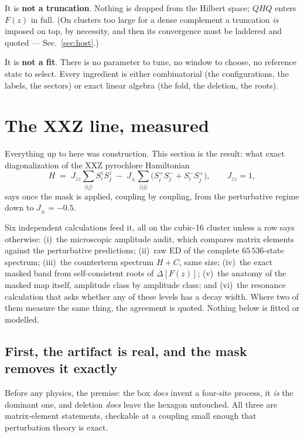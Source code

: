 \documentclass[11pt,a4paper]{article}
\newcommand{\Jpm}{J_{\pm}}
\newcommand{\Jzz}{J_{zz}}
\begin{document}
It is \textbf{not a truncation}.  Nothing is dropped from the Hilbert space;
$QHQ$ enters $F(z)$ in full.  (On clusters too large for a dense complement
a truncation \emph{is} imposed on top, by necessity, and then its
convergence must be laddered and quoted --- Sec.~\ref{sec:host}.)

It is \textbf{not a fit}.  There is no parameter to tune, no window to
choose, no reference state to select.  Every ingredient is either
combinatorial (the configurations, the labels, the sectors) or exact linear
algebra (the fold, the deletion, the roots).

\section{The XXZ line, measured}
\label{sec:strong}

Everything up to here was construction.  This section is the result: what
exact diagonalization of the XXZ pyrochlore Hamiltonian
\[
H \;=\; \Jzz\sum_{\langle ij\rangle}S^z_iS^z_j
\;-\;\Jpm\sum_{\langle ij\rangle}\bigl(S^+_iS^-_j+S^-_iS^+_j\bigr),
\qquad \Jzz=1,
\]
says once the mask is applied, coupling by coupling, from the perturbative
regime down to $\Jpm=-0.5$.

Six independent calculations feed it, all on the cubic-16 cluster unless a
row says otherwise: (i)~the microscopic amplitude audit, which compares
matrix elements against the perturbative predictions; (ii)~raw ED of the
complete $65\,536$-state spectrum; (iii)~the counterterm spectrum $H+C$,
same size; (iv)~the exact masked band from self-consistent roots of
$\Delta[F(z)]$; (v)~the anatomy of the masked map itself, amplitude class by
amplitude class; and (vi)~the resonance calculation that asks whether any of
these levels has a decay width.  Where two of them measure the same thing,
the agreement is quoted.  Nothing below is fitted or modelled.

\subsection{First, the artifact is real, and the mask removes it exactly}

Before any physics, the premise: the box \emph{does} invent a four-site
process, it \emph{is} the dominant one, and deletion \emph{does} leave the
hexagon untouched.  All three are matrix-element statements, checkable at a
coupling small enough that perturbation theory is exact.
\end{document}
